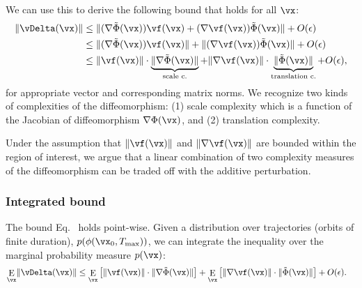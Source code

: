 \documentclass{article}
\theoremstyle{definition} \newtheorem{definition}{Definition}  \newtheorem{example}{Example}
\theoremstyle{remark} \newtheorem{remark}{Remark}
\renewcommand{\eqref}{Eq.~\originaleqref}
\newcounter{ct}
\newcommand{\divv}{\ensuremath{\mathbb{D}}}
\newcommand{\IMPdivv}[3]{\divv_{\text{IMP}}\!\left({#1}\middle\lvert\middle\rvert\,{#2}\,;{#3}\right)}
\DeclarePairedDelimiter{\norm}{\lVert}{\rVert}
\DeclareMathOperator*{\E}{\rm E} %
\newcommand{\homeo}{\Phi} %
\begin{document}
We can use this to derive the following bound that holds for all $\vx$:
\begin{align}
    \norm{\vDelta(\vx)}
    &\leq
	\norm{(\nabla\tilde\homeo(\vx)) \vf(\vx)
	+
	(\nabla\vf(\vx)) \tilde\homeo(\vx)}
	+ O(\epsilon)
    \\
    &\leq
	\norm{(\nabla\tilde\homeo(\vx)) \vf(\vx)}
	+
	\norm{(\nabla\vf(\vx)) \tilde\homeo(\vx)}
	+ O(\epsilon)
    \\
    &\leq
	\norm{\vf(\vx)}
	\cdot
	\underbrace{
	    \norm{\nabla\tilde\homeo(\vx)}
	}_{\substack{\text{scale c.}}}
	+
	\norm{\nabla\vf(\vx)}
	\cdot
	\underbrace{
	\norm{\tilde\homeo(\vx)}
	}_{\substack{\text{translation c.}}}
	+ O(\epsilon),
    \label{eq:h:bound}
\end{align}
for appropriate vector and corresponding matrix norms.
We recognize two kinds of complexities of the diffeomorphism: (1) scale complexity which is a function of the Jacobian of diffeomorphism $\nabla\homeo(\vx)$, and (2) translation complexity.

Under the assumption that $\norm{\vf(\vx)}$ and $\norm{\nabla\vf(\vx)}$ are bounded within the region of interest, we argue that a linear combination of two complexity measures of the diffeomorphism can be traded off with the additive perturbation.



\subsubsection{Integrated bound}
The bound \eqref{eq:h:bound} holds point-wise.
Given a distribution over trajectories (orbits of finite duration),
$p(\phi(\vx_0,T_\text{max}))$, we can integrate the inequality over the marginal probability measure $p(\vx)$:
\begin{align}\label{eq:h:bound:integrated}
    \E_\vx \norm{\vDelta(\vx)}
    &\leq
	\E_\vx
	\left[
	    \norm{\vf(\vx)}
	    \cdot
	    \norm{\nabla\tilde\homeo(\vx)}
	\right]
	+
	\E_\vx
	\left[
	    \norm{\nabla\vf(\vx)}
	    \cdot
	    \norm{\tilde\homeo(\vx)}
	\right]
	+ O(\epsilon).
\end{align}

\end{document}
